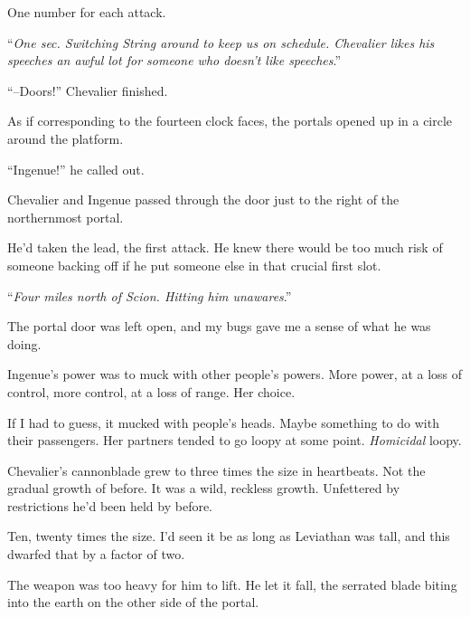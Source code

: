 One number for each attack.



``\emph{One sec.  Switching String around to keep us on schedule.  Chevalier likes his speeches an awful lot for someone who doesn't like speeches}.''



``--Doors!''  Chevalier finished.



As if corresponding to the fourteen clock faces, the portals opened up in a circle around the platform.



``Ingenue!'' he called out.



Chevalier and Ingenue passed through the door just to the right of the northernmost portal.



He'd taken the lead, the first attack.  He knew there would be too much risk of someone backing off if he put someone else in that crucial first slot.



``\emph{Four miles north of Scion.  Hitting him unawares}.''



The portal door was left open, and my bugs gave me a sense of what he was doing.



Ingenue's power was to muck with other people's powers.  More power, at a loss of control, more control, at a loss of range.  Her choice.



If I had to guess, it mucked with people's heads.  Maybe something to do with their passengers.  Her partners tended to go loopy at some point.  \emph{Homicidal} loopy.



Chevalier's cannonblade grew to three times the size in heartbeats.  Not the gradual growth of before.  It was a wild, reckless growth.  Unfettered by restrictions he'd been held by before.



Ten, twenty times the size.  I'd seen it be as long as Leviathan was tall, and this dwarfed that by a factor of two.



The weapon was too heavy for him to lift.  He let it fall, the serrated blade biting into the earth on the other side of the portal.




